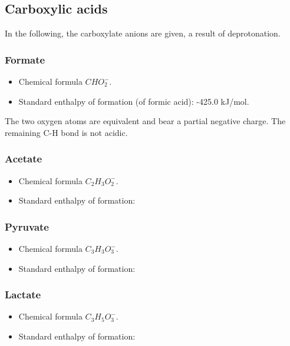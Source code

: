 \documentclass{article}
\begin{document}
\subsection{Carboxylic acids}

In the following, the carboxylate anions are given, a result of deprotonation.

\subsubsection{Formate}
\begin{itemize}
    \item Chemical formula $CHO_2^-$.
    \item Standard enthalpy of formation (of formic acid): -425.0 kJ/mol.
\end{itemize}
The two oxygen atoms are equivalent and bear a partial negative charge. The remaining C-H
bond is not acidic.

\subsubsection{Acetate}
\begin{itemize}
    \item Chemical formula $C_2H_3O_2^-$.
    \item Standard enthalpy of formation:
\end{itemize}

\subsubsection{Pyruvate}
\begin{itemize}
    \item Chemical formula $C_3H_3O_3^-$.
    \item Standard enthalpy of formation:
\end{itemize}

\subsubsection{Lactate}
\begin{itemize}
    \item Chemical formula $C_3H_5O_3^-$.
    \item Standard enthalpy of formation:
\end{itemize}
\end{document}
